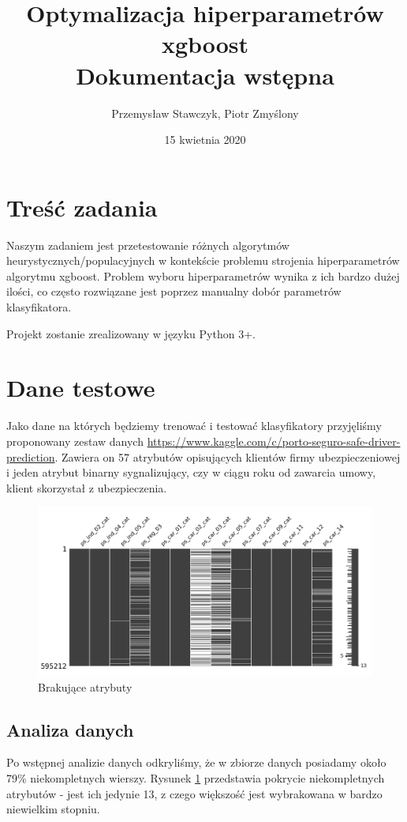 \documentclass[11pt]{article}
\title{Optymalizacja hiperparametrów xgboost\\
	\large Dokumentacja wstępna}
\author{Przemysław Stawczyk, Piotr Zmyślony}
\date{15 kwietnia 2020} %
\begin{document}
	\maketitle
	\setcounter{secnumdepth}{3}
	\setcounter{tocdepth}{3}
	\tableofcontents
	\clearpage

\section{Treść zadania}
Naszym zadaniem jest przetestowanie różnych algorytmów heurystycznych/populacyjnych w kontekście problemu strojenia hiperparametrów algorytmu xgboost. Problem wyboru hiperparametrów wynika z ich bardzo dużej ilości, co często rozwiązane jest poprzez manualny dobór parametrów klasyfikatora.

Projekt zostanie zrealizowany w języku Python 3+.
\section{Dane testowe}
Jako dane na których będziemy trenować i testować klasyfikatory przyjęliśmy proponowany zestaw danych \url{https://www.kaggle.com/c/porto-seguro-safe-driver-prediction}. Zawiera on 57 atrybutów opisujących klientów firmy ubezpieczeniowej i jeden atrybut binarny sygnalizujący, czy w ciągu roku od zawarcia umowy, klient skorzystał z ubezpieczenia.

\begin{figure}[H]
	\caption{Brakujące atrybuty}
	\label{attrib_analysis}
	\centering
	\includegraphics[width=\textwidth]{attrib_analysis}
\end{figure}

\subsection{Analiza danych}
Po wstępnej analizie danych odkryliśmy, że w zbiorze danych posiadamy około 79\% niekompletnych wierszy. Rysunek \ref{attrib_analysis} przedstawia pokrycie niekompletnych atrybutów - jest ich jedynie 13, z czego większość jest wybrakowana w bardzo niewielkim stopniu.
\end{document}
